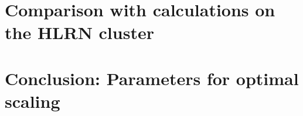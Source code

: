 \documentclass[main.tex]{subfiles}
\begin{document}


\section{Comparison with calculations on the HLRN cluster}

\section{Conclusion: Parameters for optimal scaling}
\end{document}
